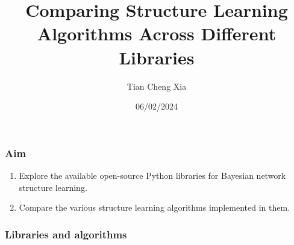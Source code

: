 \documentclass{beamer}
\title{Comparing Structure Learning Algorithms Across Different Libraries}
\author{Tian Cheng Xia}
\institute{Alma Mater Studiorum $\cdot$ University of Bologna}
\date{06/02/2024}
\begin{document}
{
    \begin{frame}
        \titlepage
    \end{frame}
    \addtocounter{framenumber}{-1}
}


\begin{frame}
    \frametitle{Aim}

    \begin{enumerate}
        \item Explore the available open-source Python libraries for Bayesian network structure learning.
        \item Compare the various structure learning algorithms implemented in them.
    \end{enumerate}
\end{frame}


\begin{frame}
    \frametitle{Libraries and algorithms}


\end{frame}
\end{document}
